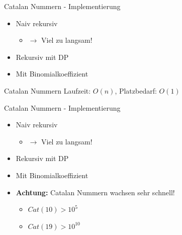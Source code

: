\documentclass[18pt]{beamer}
\begin{document}
\begin{frame}{Catalan Nummern - Implementierung}
\begin{itemize}
\item Naiv rekursiv
\begin{itemize}
\item $\rightarrow$ Viel zu langsam! 
\end{itemize}
\item Rekursiv mit DP
\item Mit Binomialkoeffizient
\end{itemize}
\end{frame}

\begin{frame} {Catalan Nummern}
Laufzeit: $O \left( n \right)$, Platzbedarf: $O \left( 1 \right)$
\end{frame}

\begin{frame}{Catalan Nummern - Implementierung}
\begin{itemize}
\item Naiv rekursiv
\begin{itemize}
\item $\rightarrow$ Viel zu langsam! 
\end{itemize}
\item Rekursiv mit DP
\item Mit Binomialkoeffizient
\item \textbf{Achtung:} Catalan Nummern wachsen sehr schnell!
\begin{itemize}
\item $Cat \left( 10 \right) > 10^5$
\item $Cat \left( 19 \right) > 10^{10}$ 
\end{itemize}
\end{itemize}
\end{frame}
\end{document}
